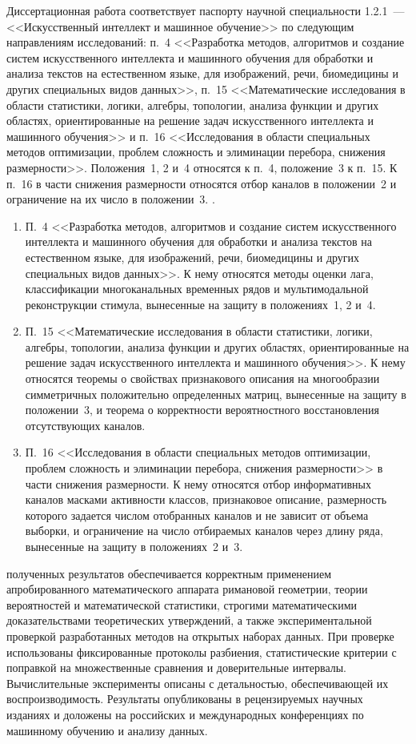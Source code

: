 {\passport} Диссертационная работа соответствует паспорту научной специальности 1.2.1~--- <<Искусственный интеллект и машинное обучение>> по следующим направлениям исследований\ifsynopsis{}: п.~4 <<Разработка методов, алгоритмов и создание систем искусственного интеллекта и машинного обучения для обработки и анализа текстов на естественном языке, для изображений, речи, биомедицины и других специальных видов данных>>, п.~15 <<Математические исследования в области статистики, логики, алгебры, топологии, анализа функции и других областях, ориентированные на решение задач искусственного интеллекта и машинного обучения>> и п.~16 <<Исследования в области специальных методов оптимизации, проблем сложность и элиминации перебора, снижения размерности>>. Положения~1, 2 и~4 относятся к п.~4, положение~3 к п.~15. К п.~16 в части снижения размерности относятся отбор каналов в положении~2 и ограничение на их число в положении~3.
\else.
\begin{enumerate}[beginpenalty=10000]
    \item П.~4 <<Разработка методов, алгоритмов и создание систем искусственного интеллекта и машинного обучения для обработки и анализа текстов на естественном языке, для изображений, речи, биомедицины и других специальных видов данных>>. К нему относятся методы оценки лага, классификации многоканальных временных рядов и мультимодальной реконструкции стимула, вынесенные на защиту в положениях~1, 2 и~4.
    \item П.~15 <<Математические исследования в области статистики, логики, алгебры, топологии, анализа функции и других областях, ориентированные на решение задач искусственного интеллекта и машинного обучения>>. К нему относятся теоремы о свойствах признакового описания на многообразии симметричных положительно определенных матриц, вынесенные на защиту в положении~3, и теорема о корректности вероятностного восстановления отсутствующих каналов.
    \item П.~16 <<Исследования в области специальных методов оптимизации, проблем сложность и элиминации перебора, снижения размерности>> в части снижения размерности. К нему относятся отбор информативных каналов масками активности классов, признаковое описание, размерность которого задается числом отобранных каналов и не зависит от объема выборки, и ограничение на число отбираемых каналов через длину ряда, вынесенные на защиту в положениях~2 и~3.
\end{enumerate}
\fi

{\reliability} полученных результатов обеспечивается корректным применением апробированного математического аппарата римановой геометрии, теории вероятностей и математической статистики, строгими математическими доказательствами теоретических утверждений, а также экспериментальной проверкой разработанных методов на открытых наборах данных. \ifsynopsis\else При проверке использованы фиксированные протоколы разбиения, статистические критерии с поправкой на множественные сравнения и доверительные интервалы. Вычислительные эксперименты описаны с детальностью, обеспечивающей их воспроизводимость. \fi{}Результаты опубликованы в рецензируемых научных изданиях и доложены на российских и международных конференциях по машинному обучению и анализу данных.

